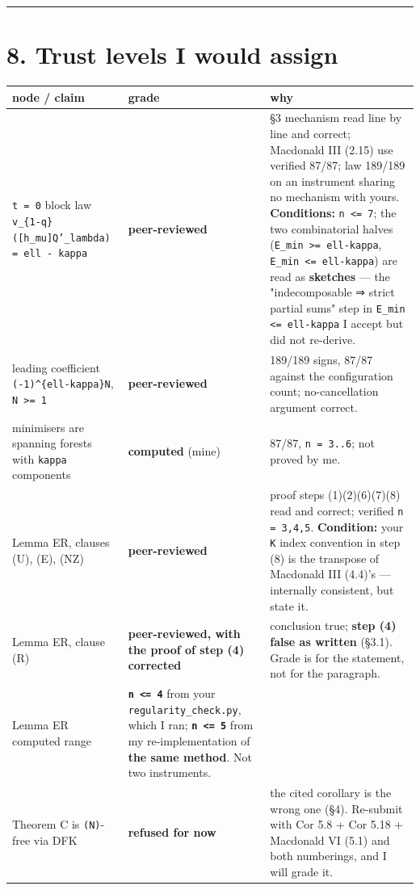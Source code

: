 \documentclass[11pt,a4paper]{article}
\begin{document}
\medskip\hrule\medskip

\section*{8. Trust levels I would assign}

\begin{center}\footnotesize
\begin{tabular}{@{}p{}p{}p{}@{}}
\hline
\textbf{node / claim} & \textbf{grade} & \textbf{why}\\ \hline
\mbox{\texttt{t = 0}} block law \mbox{\texttt{v\_\{1-q\}([h\_mu]Q'\_lambda) = ell - kappa}} & \textbf{peer-reviewed} & §3 mechanism read line by line and correct; Macdonald III (2.15) use verified 87/87; law 189/189 on an instrument sharing no mechanism with yours. \textbf{Conditions:} \mbox{\texttt{n <= 7}}; the two combinatorial halves (\mbox{\texttt{E\_min >= ell-kappa}}, \mbox{\texttt{E\_min <= ell-kappa}}) are read as \textbf{sketches} --- the "indecomposable ⇒ strict partial sums" step in \mbox{\texttt{E\_min <= ell-kappa}} I accept but did not re-derive.\\
leading coefficient \mbox{\texttt{(-1)\textasciicircum{}\{ell-kappa\}N}}, \mbox{\texttt{N >= 1}} & \textbf{peer-reviewed} & 189/189 signs, 87/87 against the configuration count; no-cancellation argument correct.\\
minimisers are spanning forests with \mbox{\texttt{kappa}} components & \textbf{computed} (mine) & 87/87, \mbox{\texttt{n = 3..6}}; not proved by me.\\
Lemma ER, clauses (U), (E), (NZ) & \textbf{peer-reviewed} & proof steps (1)(2)(6)(7)(8) read and correct; verified \mbox{\texttt{n = 3,4,5}}. \textbf{Condition:} your \mbox{\texttt{K}} index convention in step (8) is the transpose of Macdonald III (4.4)'s --- internally consistent, but state it.\\
Lemma ER, clause (R) & \textbf{peer-reviewed, with the proof of step (4) corrected} & conclusion true; \textbf{step (4) false as written} (§3.1). Grade is for the statement, not for the paragraph.\\
Lemma ER computed range & \textbf{\mbox{\texttt{n <= 4}}} from your \mbox{\texttt{regularity\_check.py}}, which I ran; \textbf{\mbox{\texttt{n <= 5}}} from my re-implementation of \textbf{the same method}. Not two instruments. & \\
Theorem C is \mbox{\texttt{(N)}}-free via DFK & \textbf{refused for now} & the cited corollary is the wrong one (§4). Re-submit with Cor 5.8 + Cor 5.18 + Macdonald VI (5.1) and both numberings, and I will grade it.\\

\end{tabular}
\end{center}
\end{document}
